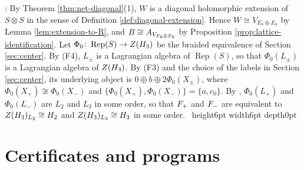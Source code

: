 \documentclass[leqno]{article}
\let\cal\relax
\newcommand{\cal}{\mathcal}
\newcommand{\qed}{\hfill \vrule height6pt  width6pt depth0pt}
\newcommand{\co}{\colon}
\newcommand{\ot}{\otimes}
\DeclareMathOperator{\Rep}{Rep}
\newenvironment{proof}[1][]{\noindent {\it Proof #1} : }{\hbox{~}\qed
\smallskip
}
\numberwithin{equation}{section}
\begin{document}
\begin{proof}
By Theorem \ref{thm:net-diagonal}(1), $W$ is a diagonal holomorphic extension of $S \ot S$ in the sense of Definition \ref{def:diagonal-extension}. Hence $W \cong V_{E_8 \oplus E_8}$ by Lemma \ref{lem:extension-to-R}, and $\cal B \cong \cal A_{V_{E_8 \oplus E_8}}$ by Proposition \ref{prop:lattice-identification}. Let $\Phi_0 \co \Rep(S) \to Z(\cal H_3)$ be the braided equivalence of Section \ref{sec:center}. By (F4), $L_\pm$ is a Lagrangian algebra of $\Rep(S)$, so that $\Phi_0(L_\pm)$ is a Lagrangian algebra of $Z(\cal H_3)$. By (F3) and the choice of the labels in Section \ref{sec:center}, its underlying object is $0 \oplus b \oplus 2\Phi_0(X_\pm)$, where $\Phi_0(X_+) \not\cong \Phi_0(X_-)$ and $\{\Phi_0(X_+),\Phi_0(X_-)\} = \{a,c_0\}$. By \cite[Proposition 3.3]{ArhII}, $\Phi_0(L_+)$ and $\Phi_0(L_-)$ are $L_2$ and $L_3$ in some order, so that $\cal F_+$ and $\cal F_-$ are equivalent to $Z(\cal H_3)_{L_2} \cong \cal H_2$ and $Z(\cal H_3)_{L_3} \cong \cal H_3$ in some order.
\end{proof}


\section{Certificates and programs}
\label{sec:certificates}
\end{document}
